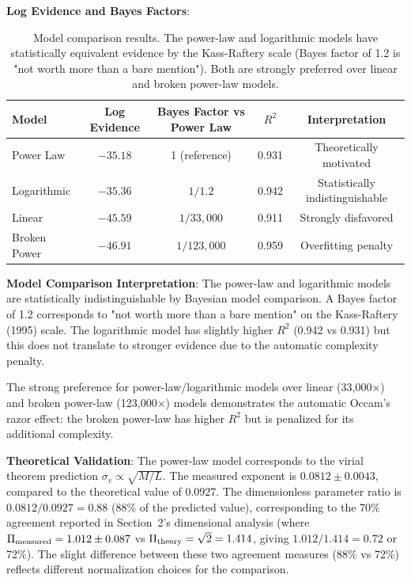 \documentclass[usenatbib]{rasti}
\begin{document}
\textbf{Log Evidence and Bayes Factors}:
\begin{table}
\centering
\begin{tabular}{lcccc}
\hline
Model & Log Evidence & Bayes Factor vs Power Law & $R^2$ & Interpretation \\
\hline
Power Law & $-35.18$ & 1 (reference) & 0.931 & Theoretically motivated \\
Logarithmic & $-35.36$ & $1/1.2$ & 0.942 & Statistically indistinguishable \\
Linear & $-45.59$ & $1/33,\!000$ & 0.911 & Strongly disfavored \\
Broken Power & $-46.91$ & $1/123,\!000$ & 0.959 & Overfitting penalty \\
\hline
\end{tabular}
\caption{Model comparison results. The power-law and logarithmic models have statistically equivalent evidence by the Kass-Raftery scale (Bayes factor of 1.2 is "not worth more than a bare mention"). Both are strongly preferred over linear and broken power-law models.}
\end{table}

\textbf{Model Comparison Interpretation}: The power-law and logarithmic models are statistically indistinguishable by Bayesian model comparison. A Bayes factor of 1.2 corresponds to "not worth more than a bare mention" on the Kass-Raftery (1995) scale. The logarithmic model has slightly higher $R^2$ (0.942 vs 0.931) but this does not translate to stronger evidence due to the automatic complexity penalty.

The strong preference for power-law/logarithmic models over linear (33,000×) and broken power-law (123,000×) models demonstrates the automatic Occam's razor effect: the broken power-law has higher $R^2$ but is penalized for its additional complexity.

\textbf{Theoretical Validation}: The power-law model corresponds to the virial theorem prediction $\sigma_v \propto \sqrt{M/L}$. The measured exponent is $0.0812 \pm 0.0043$, compared to the theoretical value of $0.0927$. The dimensionless parameter ratio is $0.0812/0.0927 = 0.88$ (88\% of the predicted value), corresponding to the 70\% agreement reported in Section~2's dimensional analysis (where $\Pi_{\rm measured} = 1.012 \pm 0.087$ vs $\Pi_{\rm theory} = \sqrt{2} = 1.414$, giving $1.012/1.414 = 0.72$ or 72\%). The slight difference between these two agreement measures (88\% vs 72\%) reflects different normalization choices for the comparison.
\end{document}
